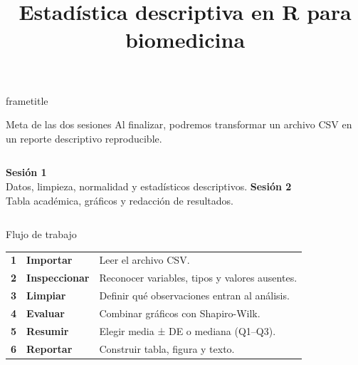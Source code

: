 \documentclass[aspectratio=169,11pt]{beamer}
\title{Estadística descriptiva en R para biomedicina}
\date{}
\begin{document}
\begin{frame}[plain]
  \begin{beamercolorbox}[wd=\paperwidth,ht=\paperheight,dp=0pt]{frametitle}
    \vspace{1.8cm}
    \hspace{1.2cm}\begin{minipage}{0.78\paperwidth}\raggedright
      {\fontsize{30}{34}\selectfont\inserttitle\par}
    \end{minipage}
  \end{beamercolorbox}
\end{frame}

\begin{frame}{Meta de las dos sesiones}
\large
Al finalizar, podremos transformar un archivo CSV en un reporte descriptivo reproducible.

\vspace{0.7cm}
\begin{columns}[T,onlytextwidth]
  \textcolor{verde}{\Large\textbf{Sesión 1}}\\[0.25cm]
  Datos, limpieza, normalidad y estadísticos descriptivos.
  \textcolor{naranja}{\Large\textbf{Sesión 2}}\\[0.25cm]
  Tabla académica, gráficos y redacción de resultados.
\end{columns}
\end{frame}

\begin{frame}{Flujo de trabajo}
\centering
\vspace{0.2cm}
\begin{tabular}{clp{8.2cm}}
\textcolor{verde}{\Large\textbf{1}} & \textbf{Importar} & Leer el archivo CSV.\\[0.3cm]
\textcolor{verde}{\Large\textbf{2}} & \textbf{Inspeccionar} & Reconocer variables, tipos y valores ausentes.\\[0.3cm]
\textcolor{verde}{\Large\textbf{3}} & \textbf{Limpiar} & Definir qué observaciones entran al análisis.\\[0.3cm]
\textcolor{verde}{\Large\textbf{4}} & \textbf{Evaluar} & Combinar gráficos con Shapiro-Wilk.\\[0.3cm]
\textcolor{verde}{\Large\textbf{5}} & \textbf{Resumir} & Elegir media ± DE o mediana (Q1--Q3).\\[0.3cm]
\textcolor{verde}{\Large\textbf{6}} & \textbf{Reportar} & Construir tabla, figura y texto.\\
\end{tabular}
\end{frame}
\end{document}
